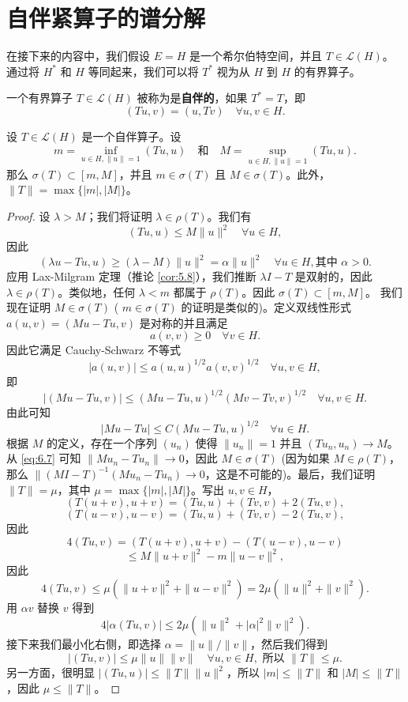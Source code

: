 \section{自伴紧算子的谱分解}

在接下来的内容中，我们假设 \(E=H\) 是一个希尔伯特空间，并且 \(T \in \mathcal{L}(H)\)。通过将 \(H^*\) 和 \(H\) 等同起来，我们可以将 \(T^*\) 视为从 \(H\) 到 \(H\) 的有界算子。

\begin{definition}
一个有界算子 \(T \in \mathcal{L}(H)\) 被称为是\textbf{自伴的}，如果 \(T^*=T\)，即
\[
(Tu, v) = (u, Tv) \quad \forall u, v \in H.
\]
\end{definition}

\begin{proposition}\label{proposition:6.9}
设 \(T \in \mathcal{L}(H)\) 是一个自伴算子。设
\[
m = \inf_{u \in H, \|u\|=1} (Tu, u) \quad \text{和} \quad M = \sup_{u \in H, \|u\|=1} (Tu, u).
\]
那么 \(\sigma(T) \subset [m, M]\)，并且 \(m \in \sigma(T)\) 且 \(M \in \sigma(T)\)。此外，\(\|T\| = \max\{|m|, |M|\}\)。
\end{proposition}

\begin{proof}
设 \(\lambda > M\)；我们将证明 \(\lambda \in \rho(T)\)。我们有
\[
(Tu, u) \le M \|u\|^2 \quad \forall u \in H,
\]
因此
\[
(\lambda u - Tu, u) \ge (\lambda - M)\|u\|^2 = \alpha \|u\|^2 \quad \forall u \in H, \text{其中 } \alpha > 0.
\]
应用 Lax-Milgram 定理（推论 \ref{cor:5.8}），我们推断 \(\lambda I - T\) 是双射的，因此 \(\lambda \in \rho(T)\)。类似地，任何 \(\lambda < m\) 都属于 \(\rho(T)\)。因此 \(\sigma(T) \subset [m, M]\)。
我们现在证明 \(M \in \sigma(T)\) ( \(m \in \sigma(T)\) 的证明是类似的)。定义双线性形式 \(a(u,v) = (Mu - Tu, v)\) 是对称的并且满足
\[
a(v,v) \ge 0 \quad \forall v \in H.
\]
因此它满足 Cauchy-Schwarz 不等式
\[
|a(u,v)| \le a(u,u)^{1/2} a(v,v)^{1/2} \quad \forall u, v \in H,
\]
即
\[
|(Mu - Tu, v)| \le (Mu - Tu, u)^{1/2} (Mv - Tv, v)^{1/2} \quad \forall u, v \in H.
\]
由此可知
\begin{equation}\label{eq:6.7}
|Mu - Tu| \le C (Mu - Tu, u)^{1/2} \quad \forall u \in H.
\end{equation}
根据 \(M\) 的定义，存在一个序列 \((u_n)\) 使得 \(\|u_n\|=1\) 并且 \((Tu_n, u_n) \to M\)。从 \eqref{eq:6.7} 可知 \(\|Mu_n - Tu_n\| \to 0\)，因此 \(M \in \sigma(T)\) (因为如果 \(M \in \rho(T)\)，那么 \(\| (MI-T)^{-1}(Mu_n - Tu_n) \to 0\)，这是不可能的)。最后，我们证明 \(\|T\| = \mu\)，其中 \(\mu = \max\{|m|, |M|\}\)。写出 \(u, v \in H\)，
\[
(T(u+v), u+v) = (Tu, u) + (Tv, v) + 2(Tu, v),
\]
\[
(T(u-v), u-v) = (Tu, u) + (Tv, v) - 2(Tu, v),
\]
因此
\[
4(Tu, v) = (T(u+v), u+v) - (T(u-v), u-v)
\]
\[
\le M\|u+v\|^2 - m\|u-v\|^2,
\]
因此
\[
4(Tu, v) \le \mu(\|u+v\|^2 + \|u-v\|^2) = 2\mu(\|u\|^2 + \|v\|^2).
\]
用 \(\alpha v\) 替换 \(v\) 得到
\[
4|\alpha (Tu, v)| \le 2\mu \left( \|u\|^2 + |\alpha|^2 \|v\|^2 \right).
\]
接下来我们最小化右侧，即选择 \(\alpha = \|u\|/\|v\|\)，然后我们得到
\[
|(Tu, v)| \le \mu \|u\| \|v\| \quad \forall u, v \in H, \text{ 所以 } \|T\| \le \mu.
\]
另一方面，很明显 \(|(Tu, u)| \le \|T\| \|u\|^2\)，所以 \(|m| \le \|T\|\) 和 \(|M| \le \|T\|\)，因此 \(\mu \le \|T\|\)。
\end{proof}

